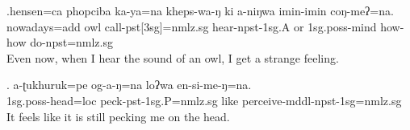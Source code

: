 \exg.hensen=ca          phopciba ka-ya=na                    kheps-wa-ŋ          ki   a-niŋwa           imin-imin coŋ-meʔ=na.\\
 nowadays{\sc =add} owl call{\sc -pst[3sg]=nmlz.sg} hear{\sc -npst-1sg.A} or   {\sc 1sg.poss-}mind how-how  do{\sc -npst=nmlz.sg}\\
Even now, when I hear the sound of an owl, I get a strange feeling.

\exg. a-ʈukhuruk=pe            og-a-ŋ=na                   loʔwa en-si-me-ŋ=na.\\
 {\sc 1sg.poss-}head{\sc =loc} peck{\sc -pst-1sg.P=nmlz.sg} like   perceive{\sc -mddl-npst-1sg=nmlz.sg}\\
It feels like it is still pecking me on the head.





